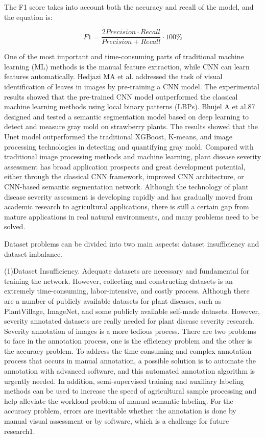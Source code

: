 The F1 score takes into account both the accuracy and recall of the model, and the equation is:

\begin{equation*} F1 = \frac{2Precision \cdot Recall}{{Precision + Recall}} \cdot 100\%\tag{6}\end{equation*}

One of the most important and time-consuming parts of traditional machine learning (ML) methods is the manual feature extraction, while CNN can learn features automatically. Hedjazi MA et al. addressed the task of visual identification of leaves in images by pre-training a CNN model. The experimental results showed that the pre-trained CNN model outperformed the classical machine learning methods using local binary patterns (LBPs). Bhujel A et al.87 designed and tested a semantic segmentation model based on deep learning to detect and measure gray mold on strawberry plants. The results showed that the Unet model outperformed the traditional XGBoost, K-means, and image processing technologies in detecting and quantifying gray mold. Compared with traditional image processing methods and machine learning, plant disease severity assessment has broad application prospects and great development potential, either through the classical CNN framework, improved CNN architecture, or CNN-based semantic segmentation network. Although the technology of plant disease severity assessment is developing rapidly and has gradually moved from academic research to agricultural applications, there is still a certain gap from mature applications in real natural environments, and many problems need to be solved.

Dataset problems can be divided into two main aspects: dataset insufficiency and dataset imbalance.

(1)Dataset Insufficiency. Adequate datasets are necessary and fundamental for training the network. However, collecting and constructing datasets is an extremely time-consuming, labor-intensive, and costly process. Although there are a number of publicly available datasets for plant diseases, such as PlantVillage, ImageNet, and some publicly available self-made datasets. However, severity annotated datasets are really needed for plant disease severity research. Severity annotation of images is a more tedious process. There are two problems to face in the annotation process, one is the efficiency problem and the other is the accuracy problem. To address the time-consuming and complex annotation process that occurs in manual annotation, a possible solution is to automate the annotation with advanced software, and this automated annotation algorithm is urgently needed. In addition, semi-supervised training and auxiliary labeling methods can be used to increase the speed of agricultural sample processing and help alleviate the workload problem of manual semantic labeling. For the accuracy problem, errors are inevitable whether the annotation is done by manual visual assessment or by software, which is a challenge for future research1.

